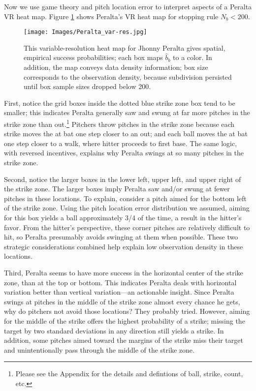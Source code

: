 Now we use game theory and pitch location error to interpret aspects of a Peralta VR heat map. Figure \ref{fig:interp} shows Peralta's VR heat map for stopping rule $N_{b} < 200$.
        \begin{figure}[H]
      	\centering      
      	\texttt{[image: Images/Peralta\_var-res.jpg]}
      	\caption{This variable-resolution heat map for Jhonny Peralta gives spatial, empirical success probabilities; each box maps $\hat{b}_{b}$ to a color. In addition, the map conveys data density information; box size corresponds to the observation density, because subdivision persisted until box sample sizes dropped below 200.}
      	\label{fig:interp}
        \end{figure}
First, notice the grid boxes inside the dotted blue strike zone box tend to be smaller; this indicates Peralta generally saw and swung at far more pitches in the strike zone than out.\footnote{Please see the Appendix for the details and defintions of ball, strike, count, etc.} Pitchers throw pitches in the strike zone because each strike moves the at bat one step closer to an out; and each ball moves the at bat one step closer to a walk, where hitter proceeds to first base. The same logic, with reversed incentives, explains why Peralta swings at so many pitches in the strike zone. 

Second, notice the larger boxes in the lower left, upper left, and upper right of the strike zone. The larger boxes imply Peralta saw and/or swung at fewer pitches in these locations. To explain, consider a pitch aimed for the bottom left of the strike zone. Using the pitch location error distribution we assumed, aiming for this box yields a ball approximately 3/4 of the time, a result in the hitter's favor. From the hitter's perspective, these corner pitches are relatively difficult to hit, so Peralta presumably avoids swinging at them when possible. These two strategic considerations combined help explain low observation density in these locations.

Third, Peralta seems to have more success in the horizontal center of the strike zone, than at the top or bottom. This indicates Peralta deals with horizontal variation better than vertical variation---an actionable insight. Since Peralta swings at pitches in the middle of the strike zone almost every chance he gets, why do pitchers not avoid those locations? They probably tried. However, aiming for the middle of the strike offers the highest probability of a strike; missing the target by two standard deviations in any direction still yields a strike. In addition, some pitches aimed toward the margins of the strike miss their target and unintentionally pass through the middle of the strike zone. 

